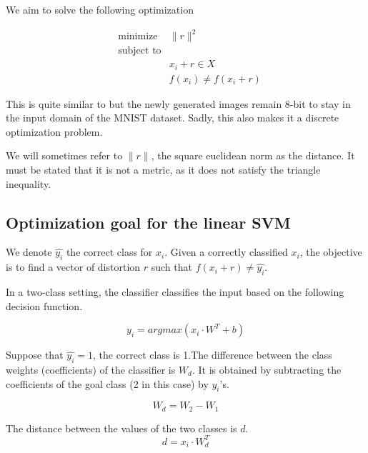 \documentclass{article} %
\begin{document}
We aim to solve the following optimization

\begin{equation}
\label{eq:optimization}
\begin{aligned}
& {\text{minimize}}
&   \lVert{r} \rVert^2\\
& \text{subject to} \\
& & x_i + r \in X \\
& & f(x_i) \neq f(x_i + r)
\end{aligned}
\end{equation}

This is quite similar to \citep{szegedy_intriguing_2013} but the newly
generated images remain 8-bit to stay in the input domain of the MNIST dataset.
Sadly, this also makes it a discrete optimization problem.

We will sometimes refer to $\lVert{r} \rVert$, the square euclidean norm as the distance. It must be stated that it is not a metric, as it does not satisfy the triangle inequality.


\subsection{Optimization goal for the linear SVM}

We denote $\widehat{y_i}$ the correct class for $x_i$. Given a correctly
classified $x_i$, the objective is to find a vector of distortion $r$ such that $f(x_i + r) \neq  \widehat{y_i}$.

In a two-class setting, the classifier classifies the input based on the following decision function.

\begin{equation}
\label{eq:decision_function}
  y_i = argmax (x_i \cdot W^T + b)
\end{equation}

Suppose that $\widehat{y_i} = 1$, the correct class is 1.The difference between the class weights (coefficients) of the classifier is $W_d$.
It is obtained by subtracting the coefficients of the goal class (2 in 
this case) by $\widehat{y_i}$'s.

\begin{equation}
\label{eq:difference}
  W_d = W_2 - W_1
\end{equation}

The distance between the values of the two classes is $d$.
\begin{equation}
\label{eq:gap}
  d = x_i \cdot W_d^T
\end{equation}
\end{document}
